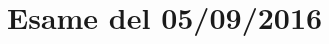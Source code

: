 \documentclass[\main/main.tex]{subfiles}
\begin{document}
\section{Esame del 05/09/2016}

\end{document}
